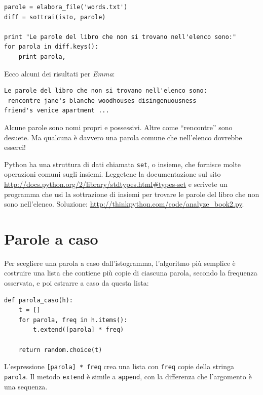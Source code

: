 \documentclass[10pt]{book}
\begin{document}
\begin{verbatim}
parole = elabora_file('words.txt')
diff = sottrai(isto, parole)

print "Le parole del libro che non si trovano nell'elenco sono:"
for parola in diff.keys():
    print parola,
\end{verbatim}
%
Ecco alcuni dei risultati per {\em Emma}:

\begin{verbatim}
Le parole del libro che non si trovano nell'elenco sono:
 rencontre jane's blanche woodhouses disingenuousness 
friend's venice apartment ...
\end{verbatim}
%
Alcune parole sono nomi propri e possessivi. Altre come ``rencontre'' sono desuete. Ma qualcuna è davvero una parola comune che nell'elenco dovrebbe esserci!

\begin{exercise}

Python ha una struttura di dati chiamata {\tt set}, o insieme, che fornisce molte operazioni comuni sugli insiemi. Leggetene la documentazione sul sito  
\url{http://docs.python.org/2/library/stdtypes.html#types-set} e scrivete un programma che usi la sottrazione di insiemi per trovare le parole del libro che non sono nell'elenco. Soluzione:
\url{http://thinkpython.com/code/analyze_book2.py}.

\end{exercise}


\section{Parole a caso}
\label{randomwords}

Per scegliere una parola a caso dall'istogramma, l'algoritmo più semplice è  costruire una lista che contiene più copie di ciascuna parola, secondo la frequenza osservata, e poi estrarre a caso da questa lista:

\begin{verbatim}
def parola_caso(h):
    t = []
    for parola, freq in h.items():
        t.extend([parola] * freq)

    return random.choice(t)
\end{verbatim}
%
L'espressione {\tt [parola] * freq} crea una lista con {\tt freq}
copie della stringa {\tt parola}.  Il metodo {\tt extend}
è simile a {\tt append}, con la differenza che l'argomento è una sequenza.
\end{document}
